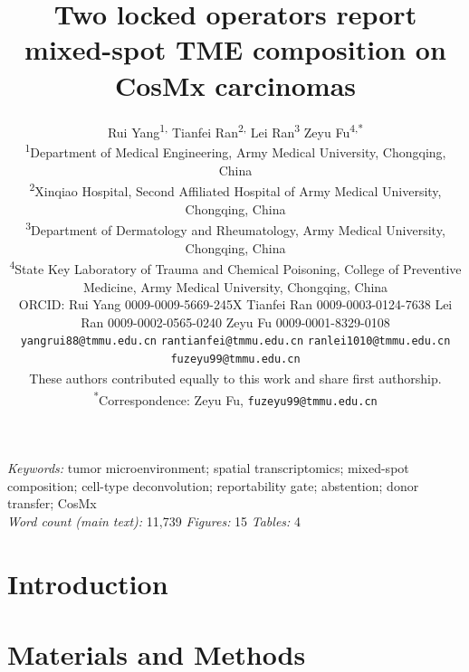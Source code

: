 \documentclass[11pt,a4paper]{article}
\title{Two locked operators report mixed-spot TME composition on CosMx carcinomas}
\author{%
\begin{minipage}{\dimexpr\textwidth-2\tabcolsep\relax}%
\centering
Rui Yang\textsuperscript{1,\dag} \quad Tianfei Ran\textsuperscript{2,\dag} \quad
Lei Ran\textsuperscript{3} \quad Zeyu Fu\textsuperscript{4,*}%
\\[5pt]
{\normalsize\textsuperscript{1}Department of Medical Engineering, Army Medical
University, Chongqing, China}%
\\
{\normalsize\textsuperscript{2}Xinqiao Hospital, Second Affiliated Hospital of
Army Medical University, Chongqing, China}%
\\
{\normalsize\textsuperscript{3}Department of Dermatology and Rheumatology, Army
Medical University, Chongqing, China}%
\\
{\normalsize\textsuperscript{4}State Key Laboratory of Trauma and Chemical
Poisoning, College of Preventive Medicine, Army Medical University, Chongqing,
China}%
\\[5pt]
{\footnotesize ORCID: Rui Yang 0009-0009-5669-245X \quad
Tianfei Ran 0009-0003-0124-7638 \quad
Lei Ran 0009-0002-0565-0240 \quad
Zeyu Fu 0009-0001-8329-0108}%
\\[3pt]
{\footnotesize\texttt{yangrui88@tmmu.edu.cn} \quad \texttt{rantianfei@tmmu.edu.cn}
\quad \texttt{ranlei1010@tmmu.edu.cn} \quad \texttt{fuzeyu99@tmmu.edu.cn}}%
\\[4pt]
{\footnotesize\textsuperscript{\dag}These authors contributed equally to this work
and share first authorship.\quad
\textsuperscript{*}Correspondence: Zeyu Fu, \texttt{fuzeyu99@tmmu.edu.cn}}%
\end{minipage}%
}
\date{}
\begin{document}
\linenumbers
\maketitle
\begin{abstract}

\end{abstract}
\noindent\textit{Keywords:} tumor microenvironment; spatial transcriptomics; mixed-spot composition; cell-type deconvolution; reportability gate; abstention; donor transfer; CosMx
\\[4pt]
\noindent\textit{Word count (main text):} 11{,}739 \quad \textit{Figures:} 15 \quad \textit{Tables:} 4

\section{Introduction}


\FloatBarrier
\section{Materials and Methods}


\begin{table}[!ht]
\centering
\caption{\protect}
\label{tab:materials}
\small

\end{table}



\begin{figure}[!ht]
\centering

\caption{\protect}
\label{fig:protocol}
\end{figure}

\begin{table}[!ht]
\centering
\caption{\protect}
\label{tab:timing}

\end{table}

\end{document}
